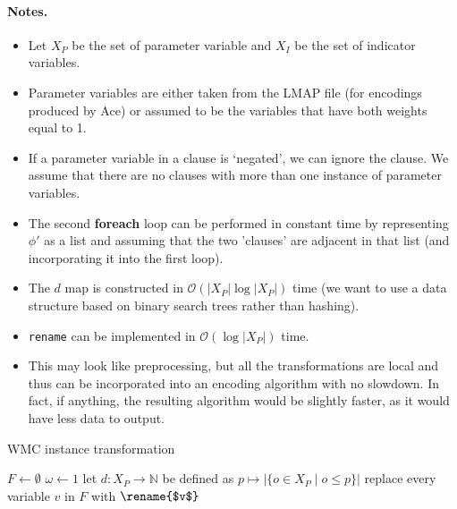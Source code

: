 \documentclass{article}
\theoremstyle{definition}
\theoremstyle{remark}
\begin{document}
\paragraph{Notes.}
\begin{itemize}
\item Let $X_P$ be the set of parameter variable and $X_I$ be the set of
  indicator variables.
\item Parameter variables are either taken from the LMAP file (for encodings
  produced by Ace) or assumed to be the variables that have both weights equal
  to 1.
\item If a parameter variable in a clause is `negated', we can ignore the
  clause. We assume that there are no clauses with more than one instance of
  parameter variables.
\item The second \textbf{foreach} loop can be performed in constant time by
  representing $\phi'$ as a list and assuming that the two 'clauses' are
  adjacent in that list (and incorporating it into the first loop).
\item The $d$ map is constructed in $\mathcal{O}(|X_P|\log|X_P|)$ time (we want
  to use a data structure based on binary search trees rather than hashing).
\item \texttt{rename} can be implemented in $\mathcal{O}(\log |X_P|)$ time.
\item This may look like preprocessing, but all the transformations are local
  and thus can be incorporated into an encoding algorithm with no slowdown. In
  fact, if anything, the resulting algorithm would be slightly faster, as it
  would have less data to output.
\end{itemize}

\begin{algorithm}
  \caption{WMC instance transformation}
  \label{alg:transformation}
  $F \gets \emptyset$\;
  $\omega \gets 1$\;
  let $d\colon X_P \to \mathbb{N}$ be defined as $p \mapsto |\{ o \in X_P \mid o
  \le p \}|$\;
  replace every variable $v$ in $F$ with $\rename{$v$}$\;
  \;
\end{algorithm}
\end{document}
